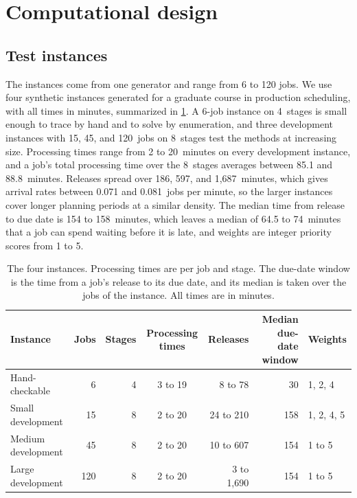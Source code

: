 \section{Computational design}\label{sec:design}

\subsection{Test instances}\label{sec:instances}

\sumpara The instances come from one generator and range from 6 to 120 jobs. \sumparaend
\fin We use four synthetic instances generated for a graduate course in production scheduling, with all times in minutes, summarized in \cref{tab:data}. \fine
\fin A 6-job instance on 4~stages is small enough to trace by hand and to solve by enumeration, and three development instances with 15, 45, and 120~jobs on 8~stages test the methods at increasing size. \fine
\fin Processing times range from 2 to 20~minutes on every development instance, and a job's total processing time over the 8~stages averages between 85.1 and 88.8~minutes. \fine
\fin Releases spread over 186, 597, and 1,687~minutes, which gives arrival rates between 0.071 and 0.081~jobs per minute, so the larger instances cover longer planning periods at a similar density. \fine
\fin The median time from release to due date is 154 to 158~minutes, which leaves a median of 64.5 to 74~minutes that a job can spend waiting before it is late, and weights are integer priority scores from 1 to 5. \fine

\begin{table}[ht]
\centering
\caption{The four instances. Processing times are per job and stage. The due-date window is the time from a job's release to its due date, and its median is taken over the jobs of the instance. All times are in minutes.}
\label{tab:data}
\small
\setlength{\tabcolsep}{4.5pt}
\begin{tabular}{lrrcrrl}
\toprule
Instance & Jobs & Stages & Processing times & Releases & Median due-date window & Weights \\
\midrule
Hand-checkable & 6 & 4 & 3 to 19 & 8 to 78 & 30 & 1, 2, 4 \\
Small development & 15 & 8 & 2 to 20 & 24 to 210 & 158 & 1, 2, 4, 5 \\
Medium development & 45 & 8 & 2 to 20 & 10 to 607 & 154 & 1 to 5 \\
Large development & 120 & 8 & 2 to 20 & 3 to 1,690 & 154 & 1 to 5 \\
\bottomrule
\end{tabular}
\end{table}

